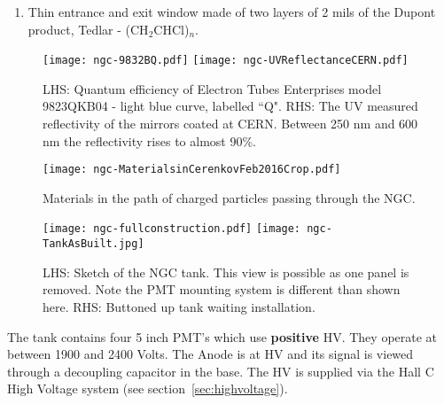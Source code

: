 {\begin{enumerate}
 The PMTs are model 9823QKB04 and tubes with serial numbers 16747,
 16777, 16787 and 16785 are installed to accept light from the mirrors
 in position Top Right, Top Left, Bottom Right and Bottom Left
 respectively while looking along increasing $z$. The tubes are
 surrounded by a mu-metal shield and the HV is distributed to the
 stages by a positive base.
\item Thin entrance and exit window made of two layers of 2 mils of
  the Dupont product, Tedlar - (CH$_2$CHCl)$_n$.
\end{enumerate}
\begin{figure}[!h] %
   \centering
   \texttt{[image: ngc-9832BQ.pdf]}
   \texttt{[image: ngc-UVReflectanceCERN.pdf]}
   \caption{LHS:
     Quantum efficiency of Electron Tubes Enterprises model 9823QKB04
     - light blue curve, labelled ``Q". RHS: The UV measured
     reflectivity of the mirrors coated at CERN. Between 250 nm and
     600 nm the reflectivity rises to almost
     90\%. \label{fig:tubeandmirror}}

\end{figure}
\begin{figure}[!h] %
   \centering
   \texttt{[image: ngc-MaterialsinCerenkovFeb2016Crop.pdf]}
   \caption{Materials
     in the path of charged particles passing through the
     NGC.\label{fig:materials}}
\end{figure}



\begin{figure}[!h] %
   \centering
   \texttt{[image: ngc-fullconstruction.pdf]}
   \texttt{[image: ngc-TankAsBuilt.jpg]}
   \caption{LHS: Sketch of the NGC tank. This view is possible as one
     panel is removed. Note the PMT mounting system is different than
     shown here.  RHS: Buttoned up tank waiting
     installation.\label{fig:Box}}

\end{figure}


The tank contains four 5 inch PMT's which use {\bf positive} HV. They
operate at between 1900 and 2400 Volts. The Anode is at HV and its
signal is viewed through a decoupling capacitor in the base.  The
HV is supplied via the Hall C High Voltage system (see
section~\ref{sec:highvoltage}).

}
